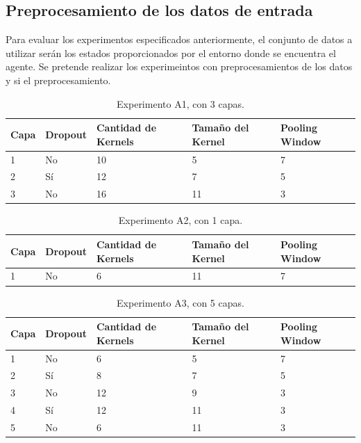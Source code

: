 \documentclass[journal]{IEEEtran}
\begin{document}
\subsection{Preprocesamiento de los datos de entrada}
Para evaluar los experimentos especificados anteriormente, el conjunto de datos a utilizar serán los estados proporcionados por el entorno donde se encuentra el agente. Se pretende realizar los experimeintos con preprocesamientos de los datos y si el preprocesamiento.

\begin{table}[]
    \centering
    
    \begin{tabular}{@{}lllll@{}}
        \toprule
        Capa & Dropout & Cantidad de Kernels & Tamaño del Kernel & Pooling Window \\ \midrule
        1    & No      & 10                  & 5                 & 7              \\
        2    & Sí      & 12                  & 7                 & 5              \\
        3    & No      & 16                  & 11                & 3              \\ \bottomrule
    \end{tabular}
    \caption{Experimento A1, con 3 capas.\label{tab:A1}}
    \end{table}

    \begin{table}[]
        \centering
        \begin{tabular}{@{}lllll@{}}
            \toprule
            Capa & Dropout & Cantidad de Kernels & Tamaño del Kernel & Pooling Window \\ \midrule
            1    & No      & 6                   & 11                & 7             
        \end{tabular}
        \caption{Experimento A2, con 1 capa.\label{tab:A2}}
        \end{table}

    \begin{table}[]
        \centering
        \begin{tabular}{@{}lllll@{}}
            \toprule
            Capa & Dropout & Cantidad de Kernels & Tamaño del Kernel & Pooling Window \\ \midrule
            1    & No      & 6                   & 5                 & 7              \\
            2    & Sí      & 8                   & 7                 & 5              \\
            3    & No      & 12                  & 9                 & 3              \\
            4    & Sí      & 12                  & 11                & 3              \\
            5    & No      & 6                   & 11                & 3              \\ \bottomrule
        \end{tabular}
        \caption{Experimento A3, con 5 capas.\label{tab:A3}}
        \end{table}
\end{document}

